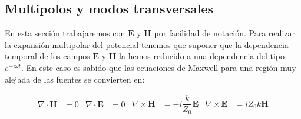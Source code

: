 \documentclass[12pt,a4paper]{article}
\newcommand{\rota}{\nabla \times}
\newcommand{\dive}{\nabla \cdot}
\newcommand{\En}{\mathbf{E}}
\newcommand{\Hn}{\mathbf{H}}
\numberwithin{equation}{section}
\numberwithin{figure}{section}
\begin{document}
\begin{figure}[h!] \centering
 \centering
\end{figure}
 

\subsection{Multipolos y modos transversales}

En esta sección trabajaremos con $\En$ y $\Hn$ por facilidad de notación. Para realizar la expansión multipolar del potencial tenemos que suponer que la dependencia temporal de los campos $\En$ y $\Hn$ la hemos reducido a una dependencia del tipo $e^{-i \omega t}$. En este caso es sabido que las ecuaciones de Maxwell para una región muy alejada de las fuentes se convierten en:


\begin{subequations}\label{Ec:4.3.Maxwell}
\begin{align}
\dive \Hn & = 0 \label{Ec:4.3.1.DivB}
\end{align}
\begin{align}
\dive \En & = 0 \label{Ec:4.3.2.DivE}
\end{align}
\begin{align}
\rota \Hn  & = - i \dfrac{k}{Z_0} \En \label{Ec:4.3.3.RotB}
\end{align}
\begin{align}
\rota \En  & = i Z_0 k  \Hn \label{Ec:4.3.4.RotE}
\end{align}
\end{subequations}
\end{document}
